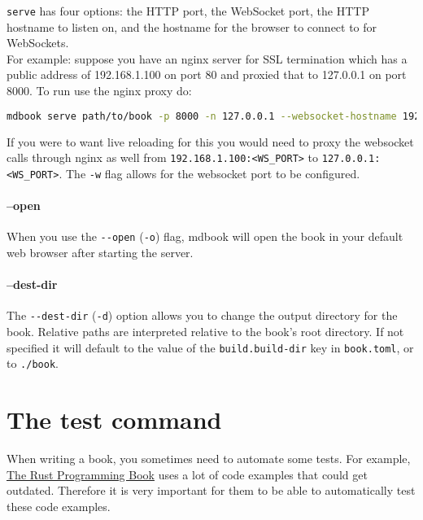 \documentclass{article}
\begin{document}
\lstinline|serve| has four options: the HTTP port, the WebSocket port, the HTTP hostname
to listen on, and the hostname for the browser to connect to for WebSockets.\\

For example: suppose you have an nginx server for SSL termination which has a
public address of 192.168.1.100 on port 80 and proxied that to 127.0.0.1 on port
8000. To run use the nginx proxy do:\\
\begin{lstlisting}[language=bash]
mdbook serve path/to/book -p 8000 -n 127.0.0.1 --websocket-hostname 192.168.1.100

\end{lstlisting}

If you were to want live reloading for this you would need to proxy the
websocket calls through nginx as well from \lstinline|192.168.1.100:<WS_PORT>| to
\lstinline|127.0.0.1:<WS_PORT>|. The \lstinline|-w| flag allows for the websocket port to be
configured.\\

\paragraph{--open}
\label{--open}
\label{open}

When you use the \lstinline|--open| (\lstinline|-o|) flag, mdbook will open the book in your
default web browser after starting the server.\\

\paragraph{--dest-dir}
\label{--dest-dir}
\label{dest-dir}

The \lstinline|--dest-dir| (\lstinline|-d|) option allows you to change the output directory for the
book. Relative paths are interpreted relative to the book's root directory. If
not specified it will default to the value of the \lstinline|build.build-dir| key in
\lstinline|book.toml|, or to \lstinline|./book|.\\

\section{The test command}
\label{The test command}
\label{the-test-command}

When writing a book, you sometimes need to automate some tests. For example,
\href{https://doc.rust-lang.org/stable/book/}{The Rust Programming Book} uses a lot
of code examples that could get outdated. Therefore it is very important for
them to be able to automatically test these code examples.\\
\end{document}
